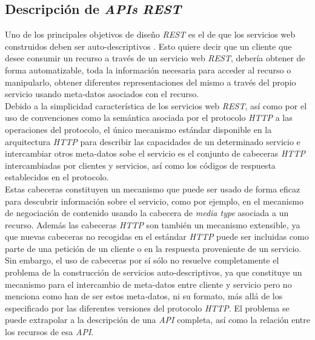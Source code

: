 \subsection{Descripci\'on de \textit{APIs} \textit{REST}}

Uno de los principales objetivos de dise\~no \textit{REST} es el de que los servicios web construidos deben ser auto-descriptivos \cite{berners1997axioms}. Esto quiere decir que un cliente que desee consumir un recurso a trav\'es de un servicio web \textit{REST}, deber\'ia obtener de forma automatizable, toda la informaci\'on necesaria para acceder al recurso o manipularlo, obtener diferentes representaciones del mismo a trav\'es del propio servicio usando meta-datos asociados con el recurso.\\

Debido a la simplicidad caracter\'istica de los servicios web \textit{REST}, as\'i como por el uso de convenciones como la sem\'antica asociada por el protocolo \textit{HTTP} a las operaciones del protocolo, el  \'unico mecanismo est\'andar disponible en la arquitectura \textit{HTTP} para describir las capacidades de un determinado servicio e intercambiar otros meta-datos sobe el servicio es el conjunto de cabeceras \textit{HTTP} intercambiadas por clientes y servicios, as\'i como los c\'odigos de respuesta establecidos en el protocolo.\\

 Estas cabeceras constituyen un mecanismo que puede ser usado de forma eficaz para descubrir informaci\'on sobre el servicio, como por ejemplo, en el mecanismo de negociaci\'on de contenido usando la cabecera de \textit{media type} asociada a un recurso. Adem\'as las cabeceras \textit{HTTP} son tambi\'en un mecanismo extensible, ya que nuevas cabeceras no recogidas en el est\'andar \textit{HTTP} puede ser incluidas como parte de una petici\'on de un cliente o en la respuesta proveniente de un servicio.\\

Sin embargo, el uso de cabeceras por s\'i s\'olo no resuelve completamente el problema de la construcci\'on de servicios auto-descriptivos, ya que constituye un mecanismo para el intercambio de meta-datos entre cliente y servicio pero no menciona como han de ser estos meta-datos, ni su formato, m\'as all\'a de los especificado por las diferentes versiones del protocolo \textit{HTTP}.
El problema se puede extrapolar a la descripci\'on de una \textit{API} completa, as\'i como la relaci\'on entre los recursos de esa \textit{API}.\\

